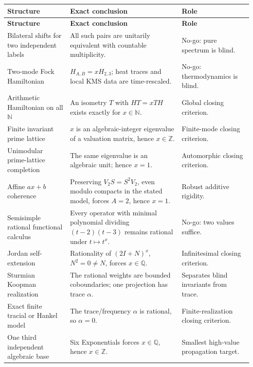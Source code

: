 \documentclass[11pt,oneside]{article}
\theoremstyle{definition}
\theoremstyle{remark}
\newcommand{\N}{\mathbb N}
\newcommand{\Z}{\mathbb Z}
\newcommand{\Q}{\mathbb Q}
\begin{document}
\begin{longtable}{>{\raggedright\arraybackslash}p{}
                  >{\raggedright\arraybackslash}p{}
                  >{\raggedright\arraybackslash}p{}}
\toprule
\textbf{Structure} & \textbf{Exact conclusion} & \textbf{Role}\\
\midrule
\endfirsthead
\toprule
\textbf{Structure} & \textbf{Exact conclusion} & \textbf{Role}\\
\midrule
\endhead
Bilateral shifts for two independent labels &
All such pairs are unitarily equivalent with countable multiplicity. &
No-go: pure spectrum is blind.\\
Two-mode Fock Hamiltonian &
\(H_{A,B}=xH_{2,3}\); heat traces and local KMS data are time-rescaled. &
No-go: thermodynamics is blind.\\
Arithmetic Hamiltonian on all \(\N\) &
An isometry \(T\) with \(HT=xTH\) exists exactly for
\(x\in\N\). &
Global closing criterion.\\
Finite invariant prime lattice &
\(x\) is an algebraic-integer eigenvalue of a valuation matrix, hence
\(x\in\Z\). &
Finite-mode closing criterion.\\
Unimodular prime-lattice completion &
The same eigenvalue is an algebraic unit; hence \(x=1\). &
Automorphic closing criterion.\\
Affine \(ax+b\) coherence &
Preserving \(V_2S=S^2V_2\), even modulo compacts in the stated model,
forces \(A=2\), hence \(x=1\). &
Robust additive rigidity.\\
Semisimple rational functional calculus &
Every operator with minimal polynomial dividing
\((t-2)(t-3)\) remains rational under \(t\mapsto t^x\). &
No-go: two values suffice.\\
Jordan self-extension &
Rationality of \((2I+N)^x\), \(N^2=0\neq N\), forces \(x\in\Q\). &
Infinitesimal closing criterion.\\
Sturmian Koopman realization &
The rational weights are bounded coboundaries; one projection has trace
\(\alpha\). &
Separates blind invariants from trace.\\
Exact finite tracial or Hankel model &
The trace/frequency \(\alpha\) is rational, so \(\alpha=0\). &
Finite-realization closing criterion.\\
One third independent algebraic base &
Six Exponentials forces \(x\in\Q\), hence \(x\in\Z\). &
Smallest high-value propagation target.\\
\bottomrule
\end{longtable}
\end{document}
